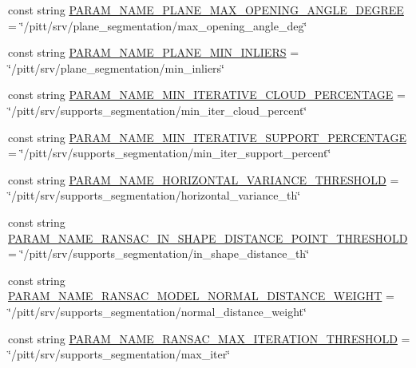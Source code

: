 \begin{DoxyCompactItemize}
\item 
const string \hyperlink{namespacesrvm_a22f7d6b9a304a08f863e8a0c0084b2f2}{P\-A\-R\-A\-M\-\_\-\-N\-A\-M\-E\-\_\-\-P\-L\-A\-N\-E\-\_\-\-M\-A\-X\-\_\-\-O\-P\-E\-N\-I\-N\-G\-\_\-\-A\-N\-G\-L\-E\-\_\-\-D\-E\-G\-R\-E\-E} = \char`\"{}/pitt/srv/plane\-\_\-segmentation/max\-\_\-opening\-\_\-angle\-\_\-deg\char`\"{}
\item 
const string \hyperlink{namespacesrvm_a279d85c7afac2390d2552ae90cd4ea05}{P\-A\-R\-A\-M\-\_\-\-N\-A\-M\-E\-\_\-\-P\-L\-A\-N\-E\-\_\-\-M\-I\-N\-\_\-\-I\-N\-L\-I\-E\-R\-S} = \char`\"{}/pitt/srv/plane\-\_\-segmentation/min\-\_\-inliers\char`\"{}
\item 
const string \hyperlink{namespacesrvm_ac6d56e59d27ae79b392d58c0b57d03e1}{P\-A\-R\-A\-M\-\_\-\-N\-A\-M\-E\-\_\-\-M\-I\-N\-\_\-\-I\-T\-E\-R\-A\-T\-I\-V\-E\-\_\-\-C\-L\-O\-U\-D\-\_\-\-P\-E\-R\-C\-E\-N\-T\-A\-G\-E} = \char`\"{}/pitt/srv/supports\-\_\-segmentation/min\-\_\-iter\-\_\-cloud\-\_\-percent\char`\"{}
\item 
const string \hyperlink{namespacesrvm_a209e7ad2de58ec5193770fc4d9cd98ab}{P\-A\-R\-A\-M\-\_\-\-N\-A\-M\-E\-\_\-\-M\-I\-N\-\_\-\-I\-T\-E\-R\-A\-T\-I\-V\-E\-\_\-\-S\-U\-P\-P\-O\-R\-T\-\_\-\-P\-E\-R\-C\-E\-N\-T\-A\-G\-E} = \char`\"{}/pitt/srv/supports\-\_\-segmentation/min\-\_\-iter\-\_\-support\-\_\-percent\char`\"{}
\item 
const string \hyperlink{namespacesrvm_adb071b5e180a1109af154bd4241a250e}{P\-A\-R\-A\-M\-\_\-\-N\-A\-M\-E\-\_\-\-H\-O\-R\-I\-Z\-O\-N\-T\-A\-L\-\_\-\-V\-A\-R\-I\-A\-N\-C\-E\-\_\-\-T\-H\-R\-E\-S\-H\-O\-L\-D} = \char`\"{}/pitt/srv/supports\-\_\-segmentation/horizontal\-\_\-variance\-\_\-th\char`\"{}
\item 
const string \hyperlink{namespacesrvm_af1a83a2964c2f60f7f497f05ef454cfd}{P\-A\-R\-A\-M\-\_\-\-N\-A\-M\-E\-\_\-\-R\-A\-N\-S\-A\-C\-\_\-\-I\-N\-\_\-\-S\-H\-A\-P\-E\-\_\-\-D\-I\-S\-T\-A\-N\-C\-E\-\_\-\-P\-O\-I\-N\-T\-\_\-\-T\-H\-R\-E\-S\-H\-O\-L\-D} = \char`\"{}/pitt/srv/supports\-\_\-segmentation/in\-\_\-shape\-\_\-distance\-\_\-th\char`\"{}
\item 
const string \hyperlink{namespacesrvm_ad592efae9026788849614a69053f3914}{P\-A\-R\-A\-M\-\_\-\-N\-A\-M\-E\-\_\-\-R\-A\-N\-S\-A\-C\-\_\-\-M\-O\-D\-E\-L\-\_\-\-N\-O\-R\-M\-A\-L\-\_\-\-D\-I\-S\-T\-A\-N\-C\-E\-\_\-\-W\-E\-I\-G\-H\-T} = \char`\"{}/pitt/srv/supports\-\_\-segmentation/normal\-\_\-distance\-\_\-weight\char`\"{}
\item 
const string \hyperlink{namespacesrvm_aa6b5f05b01cb661c1481c0f40bd916e4}{P\-A\-R\-A\-M\-\_\-\-N\-A\-M\-E\-\_\-\-R\-A\-N\-S\-A\-C\-\_\-\-M\-A\-X\-\_\-\-I\-T\-E\-R\-A\-T\-I\-O\-N\-\_\-\-T\-H\-R\-E\-S\-H\-O\-L\-D} = \char`\"{}/pitt/srv/supports\-\_\-segmentation/max\-\_\-iter\char`\"{}

\end{DoxyCompactItemize}
